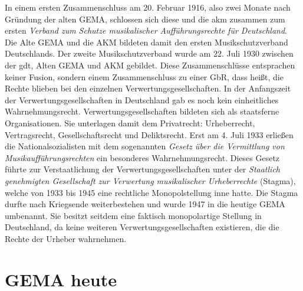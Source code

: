 \newline
In einem ersten Zusammenschluss am 20. Februar 1916, also zwei Monate nach Gründung der alten GEMA, schlossen sich diese und die \gls{akm} zusammen zum ersten \textit{Verband zum Schutze musikalischer Aufführungsrechte für Deutschland}. Die Alte GEMA und die AKM bildeten damit den ersten Musikschutzverband Deutschlands. 
\newline
Der zweite Musikschutzverband wurde am 22. Juli 1930 zwischen der \gls{gdt}, Alten GEMA und AKM gebildet.
Diese Zusammenschlüsse entsprachen keiner Fusion, sondern einem Zusammenschluss zu einer GbR, dass heißt, die Rechte blieben bei den einzelnen Verwertungsgesellschaften.
\newline
\newline
In der Anfangszeit der Verwertungsgesellschaften in Deutschland gab es noch kein einheitliches Wahrnehmungsrecht. \glqq Verwertungsgesellschaften bildeten sich als staatsferne Organisationen.\grqq{} Sie unterlagen damit dem Privatrecht: Urheberrecht, Vertragsrecht, Gesellschaftsrecht und Deliktsrecht.
\newline
Erst am 4. Juli 1933 erließen die Nationalsozialisten mit dem sogenannten \textit{Gesetz über die Vermittlung von Musikaufführungsrechten} ein besonderes Wahrnehmungsrecht. Dieses Gesetz führte zur Verstaatlichung der Verwertungsgesellschaften unter der \textit{Staatlich genehmigten Gesellschaft zur Verwertung musikalischer Urheberrechte} (Stagma), welche von 1933 bis 1945 eine rechtliche Monopolstellung inne hatte.
\newline
Die Stagma durfte nach Kriegsende weiterbestehen und wurde 1947 in die heutige GEMA umbenannt. Sie besitzt seitdem eine faktisch monopolartige Stellung in Deutschland, da keine weiteren Verwertungsgesellschaften existieren, die die Rechte der Urheber wahrnehmen.
\section{GEMA heute}

